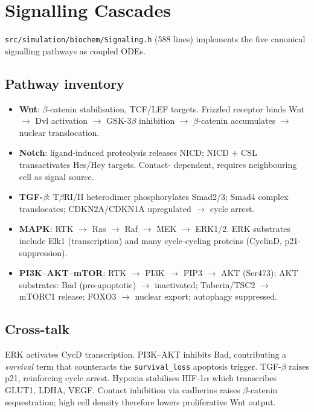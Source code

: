 \documentclass[11pt,letterpaper,twoside,openany]{book}
\newcommand{\code}[1]{\texttt{#1}}
\newcommand{\file}[1]{\texttt{\small#1}}
\begin{document}
\chapter{Signalling Cascades}
\label{ch:signaling}

\file{src/simulation/biochem/Signaling.h} (588 lines) implements
the five canonical signalling pathways as coupled ODEs.

\section{Pathway inventory}

\begin{itemize}
  \item \textbf{Wnt}: $\beta$-catenin stabilisation, TCF/LEF
        targets. Frizzled receptor binds Wnt $\to$ Dvl
        activation $\to$ GSK-3$\beta$ inhibition $\to$
        $\beta$-catenin accumulates $\to$ nuclear translocation.
  \item \textbf{Notch}: ligand-induced proteolysis releases NICD;
        NICD + CSL transactivates Hes/Hey targets. Contact-
        dependent, requires neighbouring cell as signal source.
  \item \textbf{TGF-$\beta$}: T$\beta$RI/II heterodimer
        phosphorylates Smad2/3; Smad4 complex translocates;
        CDKN2A/CDKN1A upregulated $\to$ cycle arrest.
  \item \textbf{MAPK}: RTK $\to$ Ras $\to$ Raf $\to$ MEK $\to$
        ERK1/2. ERK substrates include Elk1 (transcription) and
        many cycle-cycling proteins (CyclinD, p21-suppression).
  \item \textbf{PI3K--AKT--mTOR}: RTK $\to$ PI3K $\to$ PIP3 $\to$
        AKT (Ser473); AKT substrates: Bad (pro-apoptotic) $\to$
        inactivated; Tuberin/TSC2 $\to$ mTORC1 release;
        FOXO3 $\to$ nuclear export; autophagy suppressed.
\end{itemize}

\section{Cross-talk}

ERK activates CycD transcription. PI3K--AKT inhibits Bad,
contributing a \emph{survival} term that counteracts the
\code{survival\_loss} apoptosis trigger. TGF-$\beta$ raises p21,
reinforcing cycle arrest. Hypoxia stabilises HIF-1$\alpha$ which
transcribes GLUT1, LDHA, VEGF. Contact inhibition via cadherins
raises $\beta$-catenin sequestration; high cell density therefore
lowers proliferative Wnt output.
\end{document}
